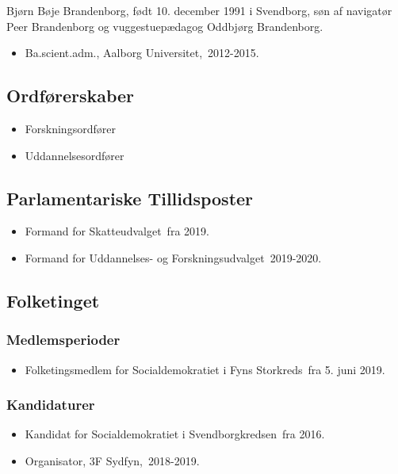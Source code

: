 \documentclass[11pt, a4paper]{awesome-cv}
\begin{document}
\makecvheader[R]
\makelettertitle
\begin{cvletter}
Bjørn Bøje Brandenborg, født 10. december 1991 i Svendborg, søn af navigatør Peer Brandenborg og vuggestuepædagog Oddbjørg Brandenborg.

\begin{itemize}
\item Ba.scient.adm., Aalborg Universitet, 2012-2015.
\end{itemize}
\subsection*{Ordførerskaber}
\begin{itemize}
\item Forskningsordfører
\item Uddannelsesordfører
\end{itemize}
\subsection*{Parlamentariske Tillidsposter}
\begin{itemize}
\item Formand for Skatteudvalget fra 2019.
\item Formand for Uddannelses- og Forskningsudvalget 2019-2020.
\end{itemize}
\subsection*{Folketinget}
\subsubsection*{Medlemsperioder}
\begin{itemize}
\item Folketingsmedlem for Socialdemokratiet i Fyns Storkreds fra 5. juni 2019.
\end{itemize}
\subsubsection*{Kandidaturer}
\begin{itemize}
\item Kandidat for Socialdemokratiet i Svendborgkredsen fra 2016.
\end{itemize}
\begin{itemize}
\item Organisator, 3F Sydfyn, 2018-2019.
\end{itemize}
\end{cvletter}
\end{document}
